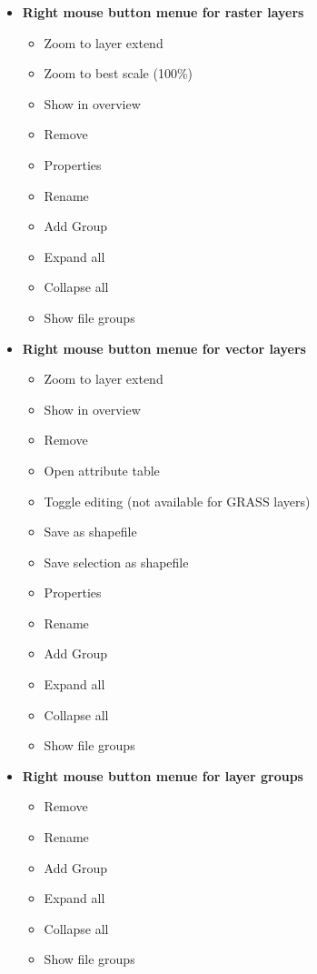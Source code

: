 \begin{itemize}

\item \textbf{Right mouse button menue for raster layers}
\begin{itemize}
\item Zoom to layer extend
\item Zoom to best scale (100\%)
\item Show in overview
\item Remove
\item Properties
\item Rename
\item Add Group
\item Expand all
\item Collapse all
\item Show file groups
\end{itemize}

\item \textbf{Right mouse button menue for vector layers}
\begin{itemize}
\item Zoom to layer extend
\item Show in overview
\item Remove
\item Open attribute table
\item Toggle editing (not available for GRASS layers)
\item Save as shapefile
\item Save selection as shapefile
\item Properties
\item Rename
\item Add Group
\item Expand all
\item Collapse all
\item Show file groups
\end{itemize}

\item \textbf{Right mouse button menue for layer groups} 
\begin{itemize}
\item Remove
\item Rename
\item Add Group
\item Expand all
\item Collapse all
\item Show file groups
\end{itemize}

\end{itemize}

